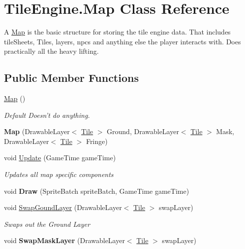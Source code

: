 \hypertarget{class_tile_engine_1_1_map}{\section{Tile\-Engine.\-Map Class Reference}
\label{d9/da2/class_tile_engine_1_1_map}
}


A \hyperlink{class_tile_engine_1_1_map}{Map} is the basic structure for storing the tile engine data. That includes tile\-Sheets, Tiles, layers, npcs and anything else the player interacts with. Does practically all the heavy lifting.  


\subsection*{Public Member Functions}
\begin{DoxyCompactItemize}
\item 
\hyperlink{class_tile_engine_1_1_map_a4eb00a552276ff41866e9ee93bab07b5}{Map} ()
\begin{DoxyCompactList}\small\item\em Default Doesn't do anything. \end{DoxyCompactList}\item 
\hypertarget{class_tile_engine_1_1_map_aa4df62a4695b5db2cedfd64ddbc91db2}{{\bfseries Map} (Drawable\-Layer$<$ \hyperlink{class_tile_engine_1_1_tile}{Tile} $>$ Ground, Drawable\-Layer$<$ \hyperlink{class_tile_engine_1_1_tile}{Tile} $>$ Mask, Drawable\-Layer$<$ \hyperlink{class_tile_engine_1_1_tile}{Tile} $>$ Fringe)}\label{d9/da2/class_tile_engine_1_1_map_aa4df62a4695b5db2cedfd64ddbc91db2}

\item 
void \hyperlink{class_tile_engine_1_1_map_a12ef500e268d17426c0d8514c6dffdb8}{Update} (Game\-Time game\-Time)
\begin{DoxyCompactList}\small\item\em Updates all map specific components \end{DoxyCompactList}\item 
\hypertarget{class_tile_engine_1_1_map_ac3a75d6adf05439945a1630e8dca078c}{void {\bfseries Draw} (Sprite\-Batch sprite\-Batch, Game\-Time game\-Time)}\label{d9/da2/class_tile_engine_1_1_map_ac3a75d6adf05439945a1630e8dca078c}

\item 
void \hyperlink{class_tile_engine_1_1_map_a513c64dbda5b20aa08df5c74c4c93a90}{Swap\-Gound\-Layer} (Drawable\-Layer$<$ \hyperlink{class_tile_engine_1_1_tile}{Tile} $>$ swap\-Layer)
\begin{DoxyCompactList}\small\item\em Swaps out the Ground Layer \end{DoxyCompactList}\item 
\hypertarget{class_tile_engine_1_1_map_ae59f7b88d73a061a0b02587e63588b9d}{void {\bfseries Swap\-Mask\-Layer} (Drawable\-Layer$<$ \hyperlink{class_tile_engine_1_1_tile}{Tile} $>$ swap\-Layer)}\label{d9/da2/class_tile_engine_1_1_map_ae59f7b88d73a061a0b02587e63588b9d}


\end{DoxyCompactItemize}
